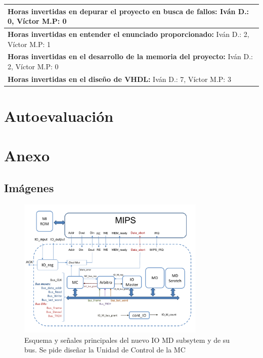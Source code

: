 \documentclass{article}
\newcommand{\horasVhdl}[2]{\textbf{Horas invertidas en el diseño de VHDL:} Iván D.: #1, Víctor M.P: #2\par\nointerlineskip}
\newcommand{\horasEntenderEnunciado}[2]{\textbf{Horas invertidas en entender el enunciado proporcionado:} Iván D.: #1, Víctor M.P: #2\par\nointerlineskip}
\newcommand{\horasDepuracion}[2]{\textbf{Horas invertidas en depurar el proyecto en busca de fallos:} Iván D.: #1, Víctor M.P: #2\par\nointerlineskip}
\newcommand{\horasMemoria}[2]{\textbf{Horas invertidas en el desarrollo de la memoria del proyecto:} Iván D.: #1, Víctor M.P: #2\par\nointerlineskip}
\begin{document}
\begin{table}[h]
\centering
\begin{tabularx}{\textwidth}{|X|}
\hline
\horasDepuracion{0}{0} \\
\hline
\horasEntenderEnunciado{2}{1} \\
\hline
\horasMemoria{2}{0} \\
\hline
\horasVhdl{7}{3} \\
\hline
\end{tabularx}
\end{table}

\section{Autoevaluación}
\lipsum[15-18]

\newpage
\section{Anexo}
\subsection{Imágenes}
\begin{figure}[htbp]
  \centering
  \includegraphics[page=1, width=0.8\textwidth, clip]{assets/AOC2_2024_Esquemas_Proy2.pdf}
  \caption{Esquema y señales principales del nuevo IO MD subsytem y de su bus. Se pide diseñar la
Unidad de Control de la MC}
  \label{fig:imagen}
\end{figure}

\newpage

\end{document}

